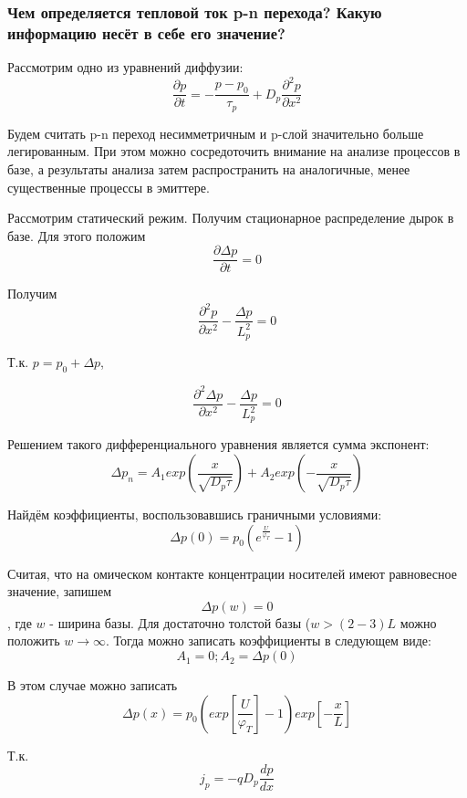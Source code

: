 \subsubsection{Чем определяется тепловой ток p-n перехода? Какую информацию несёт в себе его значение?}

Рассмотрим одно из уравнений диффузии:
\begin{equation}
\frac{\partial p}{\partial t} = - \frac{p - p_0}{\tau_p} + D_p\frac{\partial^2p}{\partial x^2}
\end{equation}

Будем считать p-n переход несимметричным и p-слой значительно больше легированным. При этом можно сосредоточить внимание на анализе процессов в базе, а результаты анализа затем распространить на аналогичные, менее существенные процессы в эмиттере.

Рассмотрим статический режим. Получим стационарное распределение дырок в базе. Для этого положим
$$
\frac{\partial \Delta p}{\partial t} = 0
$$

Получим
$$
\frac{\partial^2p}{\partial x^2} - \frac{\Delta p}{L_p^2} = 0
$$

Т.к. $p = p_0 + \Delta p$, 

$$
\frac{\partial^2\Delta p}{\partial x^2} - \frac{\Delta p}{L_p^2} = 0
$$

Решением такого дифференциального уравнения является сумма экспонент:
$$
\Delta p_n = A_1 exp\left(\frac{x}{\sqrt{D_p\tau}}\right) + A_2 exp\left(-\frac{x}{\sqrt{D_p\tau}}\right)
$$

Найдём коэффициенты, воспользовавшись граничными условиями:
$$
\Delta p(0) = p_0\left(e^{\frac{U}{\varphi_T}} - 1\right)
$$

Считая, что на омическом контакте концентрации носителей имеют равновесное значение, запишем
$$
\Delta p(w) = 0
$$, где $w$ - ширина базы.
Для достаточно толстой базы ($w > (2-3)L$ можно положить $w \rightarrow \infty$. Тогда можно записать коэффициенты в следующем виде:
$$
A_1 = 0; A_2 = \Delta p(0)
$$

В этом случае можно записать
$$
\Delta p(x) = p_0 \left(exp\left[\frac{U}{\varphi_T}\right] -1 \right) exp\left[-\frac{x}{L}\right]
$$

Т.к.
$$
j_p = -qD_p\frac{dp}{dx}
$$


